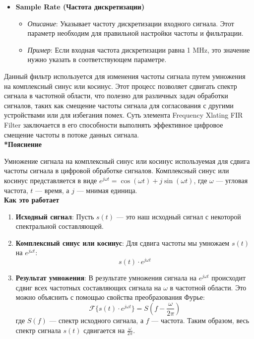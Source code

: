 \documentclass[a4paper,12pt]{extarticle}
\begin{document}
\begin{itemize}
    \item \textbf{Sample Rate (Частота дискретизации)}
    \begin{itemize}
        \item \textit{Описание}: Указывает частоту дискретизации входного сигнала. Этот параметр необходим для правильной настройки частоты и фильтрации.
        \item \textit{Пример}: Если входная частота дискретизации равна 1 MHz, это значение нужно указать в соответствующем параметре.
    \end{itemize}
\end{itemize}
\vspace{0.25cm}

Данный фильтр используется для изменения частоты сигнала путем умножения на комплексный синус 
или косинус. Этот процесс позволяет сдвигать спектр сигнала в частотной области, что полезно 
для различных задач обработки сигналов, таких как смещение частоты сигнала для согласования с 
другими устройствами или для избегания помех. Суть элемента Frequency Xlating FIR Filter 
заключается в его способности выполнять эффективное цифровое смещение частоты в потоке данных 
сигнала.
\vspace{0.25cm}\\
\vspace{0.25cm}
\textbf{*Пояснение}

Умножение сигнала на комплексный синус или косинус используемая для сдвига частоты сигнала в 
цифровой обработке сигналов. Комплексный синус или косинус представляется в виде 
\(e^{j\omega t} = \cos(\omega t) + j\sin(\omega t)\), где \(\omega\) — угловая частота, \(t\) — 
время, а \(j\) — мнимая единица.
\vspace{0.25cm}\\
\textbf{Как это работает}

\begin{enumerate}
    \item \textbf{Исходный сигнал}: Пусть \(s(t)\) — это наш исходный сигнал с некоторой спектральной составляющей.
    \item \textbf{Комплексный синус или косинус}: Для сдвига частоты мы умножаем \(s(t)\) на \(e^{j\omega t}\):
    \[
    s(t) \cdot e^{j\omega t}
    \]
    \item \textbf{Результат умножения}: В результате умножения сигнала на \(e^{j\omega t}\) происходит сдвиг всех частотных составляющих сигнала на \(\omega\) в частотной области. Это можно объяснить с помощью свойства преобразования Фурье:
    \[
    \mathcal{F}\{s(t) \cdot e^{j\omega t}\} = S(f - \frac{\omega}{2\pi})
    \]
    где \(S(f)\) — спектр исходного сигнала, а \(f\) — частота. Таким образом, весь спектр сигнала \(s(t)\) сдвигается на \(\frac{\omega}{2\pi}\).
\end{enumerate}
\end{document}
